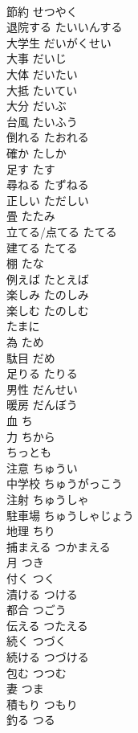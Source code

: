 \documentclass[8pt]{extreport}
\begin{document}
\begin{CJK}{UTF8}{min}
\\	節約	せつやく	
\\	退院する	たいいんする	
\\	大学生	だいがくせい	
\\	大事	だいじ	
\\	大体	だいたい	
\\	大抵	たいてい	
\\	大分	だいぶ	
\\	台風	たいふう	
\\	倒れる	たおれる	
\\	確か	たしか	
\\	足す	たす	
\\	尋ねる	たずねる	
\\	正しい	ただしい	
\\	畳	たたみ	
\\	立てる/点てる	たてる	
\\	建てる	たてる	
\\	棚	たな	
\\	例えば	たとえば	
\\	楽しみ	たのしみ	
\\	楽しむ	たのしむ	
\\	たまに		
\\	為	ため	
\\	駄目	だめ	
\\	足りる	たりる	
\\	男性	だんせい	
\\	暖房	だんぼう	
\\	血	ち	
\\	力	ちから	
\\	ちっとも		
\\	注意	ちゅうい	
\\	中学校	ちゅうがっこう	
\\	注射	ちゅうしゃ	
\\	駐車場	ちゅうしゃじょう	
\\	地理	ちり	
\\	捕まえる	つかまえる	
\\	月	つき	
\\	付く	つく	
\\	漬ける	つける	
\\	都合	つごう	
\\	伝える	つたえる	
\\	続く	つづく	
\\	続ける	つづける	
\\	包む	つつむ	
\\	妻	つま	
\\	積もり	つもり	
\\	釣る	つる	

\end{CJK}
\end{document}
